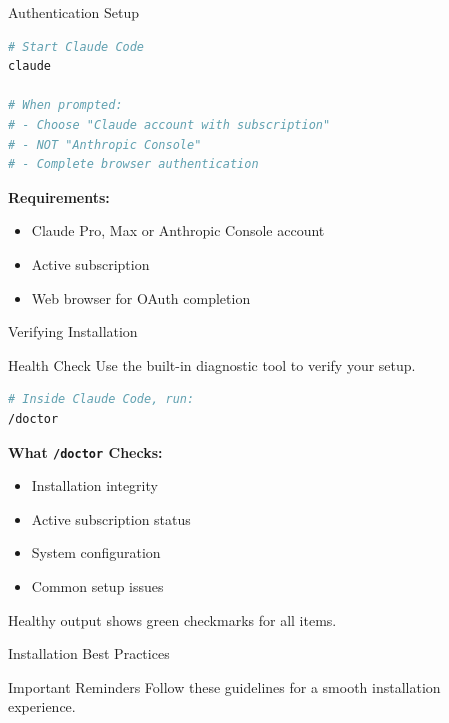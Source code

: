 \documentclass[10pt]{beamer}
\begin{document}
{\begin{frame}[fragile]{Authentication Setup}
\begin{lstlisting}[language=bash]
# Start Claude Code
claude

# When prompted:
# - Choose "Claude account with subscription"
# - NOT "Anthropic Console"
# - Complete browser authentication
\end{lstlisting}
		
		\textbf{Requirements:}
		\begin{itemize}
			\item Claude Pro, Max or Anthropic Console account
			\item Active subscription
			\item Web browser for OAuth completion
		\end{itemize}
	\end{frame}
	
	\begin{frame}[fragile]{Verifying Installation}
		\begin{block}{Health Check}
			Use the built-in diagnostic tool to verify your setup.
		\end{block}
		
\begin{lstlisting}[language=bash]
# Inside Claude Code, run:
/doctor
\end{lstlisting}

		\textbf{What \texttt{/doctor} Checks:}
		\begin{itemize}
			\item Installation integrity
			\item Active subscription status
			\item System configuration
			\item Common setup issues
		\end{itemize}
		
		\vspace{0.3cm}
		
		\alert{Healthy output shows green checkmarks for all items.}
	\end{frame}
	
	\begin{frame}{Installation Best Practices}
		\begin{alertblock}{Important Reminders}
			Follow these guidelines for a smooth installation experience.
		\end{alertblock}
		
		\vspace{0.5cm}
		

\end{frame}}
\end{document}
